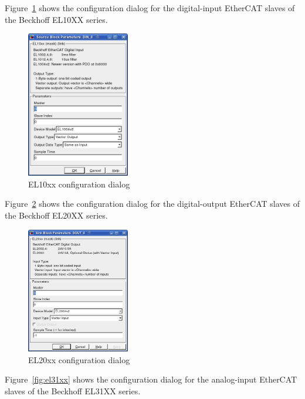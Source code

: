 Figure~\ref{fig:el10xx} shows the configuration dialog for the
digital-input EtherCAT slaves of the Beckhoff EL10XX series.

\begin{figure}[H]
  \begin{center}
    \includegraphics[width=0.4\textwidth]{images/el10xx.png}
    \caption{EL10xx configuration dialog}
    \label{fig:el10xx}
  \end{center}
\end{figure}

Figure~\ref{fig:el20xx} shows the configuration dialog for the
digital-output EtherCAT slaves of the Beckhoff EL20XX series.

\begin{figure}[H]
  \begin{center}
    \includegraphics[width=0.4\textwidth]{images/el20xx.png}
    \caption{EL20xx configuration dialog}
    \label{fig:el20xx}
  \end{center}
\end{figure}

Figure~\ref{fig:el31xx} shows the configuration dialog for the
analog-input EtherCAT slaves of the Beckhoff EL31XX series.

